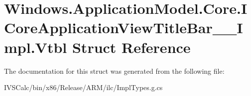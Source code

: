 \hypertarget{struct_windows_1_1_application_model_1_1_core_1_1_i_core_application_view_title_bar_____impl_1_1_vtbl}{}\section{Windows.\+Application\+Model.\+Core.\+I\+Core\+Application\+View\+Title\+Bar\+\_\+\+\_\+\+Impl.\+Vtbl Struct Reference}
\label{struct_windows_1_1_application_model_1_1_core_1_1_i_core_application_view_title_bar_____impl_1_1_vtbl}


The documentation for this struct was generated from the following file\+:\begin{DoxyCompactItemize}
\item 
I\+V\+S\+Calc/bin/x86/\+Release/\+A\+R\+M/ilc/Impl\+Types.\+g.\+cs\end{DoxyCompactItemize}
